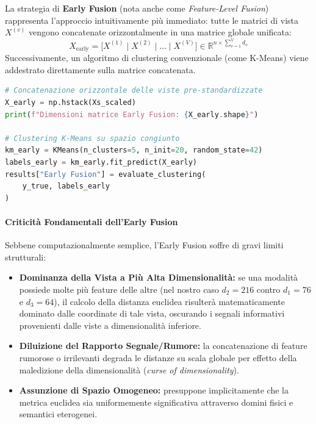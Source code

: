 La strategia di \textbf{Early Fusion} (nota anche come \textit{Feature-Level Fusion}) rappresenta l'approccio intuitivamente più immediato: tutte le matrici di vista $X^{(v)}$ vengono concatenate orizzontalmente in una matrice globale unificata:
\begin{equation}
    X_{\text{early}} = \big[ X^{(1)} \mid X^{(2)} \mid \dots \mid X^{(V)} \big] \in \mathbb{R}^{n \times \sum_{v=1}^V d_v}
\end{equation}
Successivamente, un algoritmo di clustering convenzionale (come K-Means) viene addestrato direttamente sulla matrice concatenata.

\begin{lstlisting}[language=Python, caption={Implementazione di Early Fusion con concatenazione e K-Means.}]
# Concatenazione orizzontale delle viste pre-standardizzate
X_early = np.hstack(Xs_scaled)
print(f"Dimensioni matrice Early Fusion: {X_early.shape}")

# Clustering K-Means su spazio congiunto
km_early = KMeans(n_clusters=5, n_init=20, random_state=42)
labels_early = km_early.fit_predict(X_early)
results["Early Fusion"] = evaluate_clustering(
    y_true, labels_early
)
\end{lstlisting}

\paragraph{Criticità Fondamentali dell'Early Fusion}
Sebbene computazionalmente semplice, l'Early Fusion soffre di gravi limiti strutturali:
\begin{itemize}
    \item \textbf{Dominanza della Vista a Più Alta Dimensionalità:} se una modalità possiede molte più feature delle altre (nel nostro caso $d_2 = 216$ contro $d_1 = 76$ e $d_3 = 64$), il calcolo della distanza euclidea risulterà matematicamente dominato dalle coordinate di tale vista, oscurando i segnali informativi provenienti dalle viste a dimensionalità inferiore.
    \item \textbf{Diluizione del Rapporto Segnale/Rumore:} la concatenazione di feature rumorose o irrilevanti degrada le distanze su scala globale per effetto della maledizione della dimensionalità (\textit{curse of dimensionality}).
    \item \textbf{Assunzione di Spazio Omogeneo:} presuppone implicitamente che la metrica euclidea sia uniformemente significativa attraverso domini fisici e semantici eterogenei.
\end{itemize}

